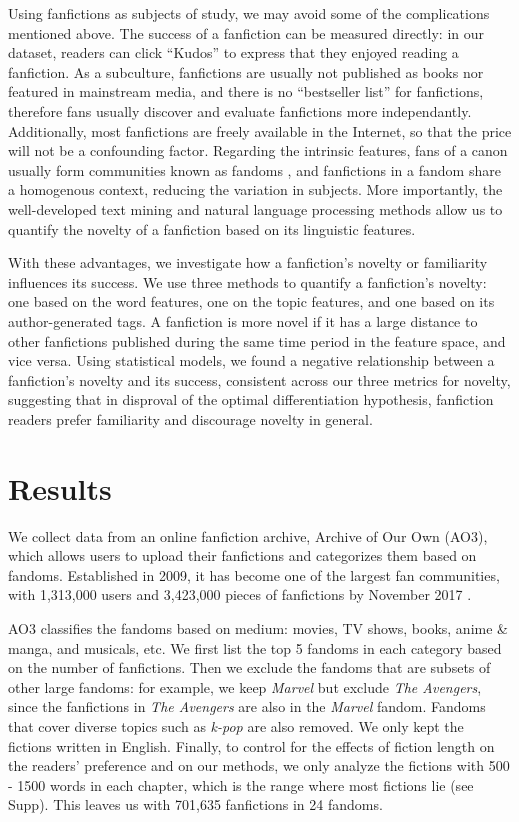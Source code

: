 \documentclass[a4paper]{article}
\begin{document}
Using fanfictions as subjects of study, we may avoid some of the complications mentioned above. The success of a fanfiction can be measured directly: in our dataset, readers can click ``Kudos'' to express that they enjoyed reading a fanfiction. As a subculture, fanfictions are usually not published as books nor featured in mainstream media, and there is no ``bestseller list'' for fanfictions, therefore fans usually discover and evaluate fanfictions more independantly. Additionally, most fanfictions are freely available in the Internet, so that the price will not be a confounding factor. Regarding the intrinsic features, fans of a canon usually form communities known as fandoms \cite{wiki:fandom}, and fanfictions in a fandom share a homogenous context, reducing the variation in subjects. More importantly, the well-developed text mining and natural language processing methods allow us to quantify the novelty of a fanfiction based on its linguistic features.

With these advantages, we investigate how a fanfiction's novelty or familiarity influences its success. We use three methods to quantify a fanfiction's novelty: one based on the word features, one on the topic features, and one based on its author-generated tags. A fanfiction is more novel if it has a large distance to other fanfictions published during the same time period in the feature space, and vice versa. Using statistical models, we found a negative relationship between a fanfiction's novelty and its success, consistent across our three metrics for novelty, suggesting that in disproval of the optimal differentiation hypothesis, fanfiction readers prefer familiarity and discourage novelty in general.



\section*{Results} 
We collect data from an online fanfiction archive, Archive of Our Own (AO3), which allows users to upload their fanfictions and categorizes them based on fandoms. Established in 2009, it has become one of the largest fan communities, with 1,313,000 users and 3,423,000 pieces of fanfictions by November 2017 \cite{ao3stats}.

AO3 classifies the fandoms based on medium: movies, TV shows, books, anime \& manga, and musicals, etc. We first list the top 5 fandoms in each category based on the number of fanfictions. Then we exclude the fandoms that are subsets of other large fandoms: for example, we keep \emph{Marvel} but exclude \emph{The Avengers}, since the fanfictions in \emph{The Avengers} are also in the \emph{Marvel} fandom. Fandoms that cover diverse topics such as \emph{k-pop} are also removed. We only kept the fictions written in English. Finally, to control for the effects of fiction length on the readers' preference and on our methods, we only analyze the fictions with 500 - 1500 words in each chapter, which is the range where most fictions lie (see Supp). This leaves us with 701,635 fanfictions in 24 fandoms.
\end{document}
